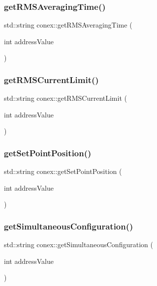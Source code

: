 \subsubsection{\texorpdfstring{get\+R\+M\+S\+Averaging\+Time()}{getRMSAveragingTime()}}
{\footnotesize\ttfamily std\+::string conex\+::get\+R\+M\+S\+Averaging\+Time (\begin{DoxyParamCaption}\item[{int}]{address\+Value }\end{DoxyParamCaption})}

\mbox{\label{namespaceconex_a7f0202ac44e29e633656eac06ca43cd0}} 
\subsubsection{\texorpdfstring{get\+R\+M\+S\+Current\+Limit()}{getRMSCurrentLimit()}}
{\footnotesize\ttfamily std\+::string conex\+::get\+R\+M\+S\+Current\+Limit (\begin{DoxyParamCaption}\item[{int}]{address\+Value }\end{DoxyParamCaption})}

\mbox{\label{namespaceconex_a785c9ad7e52441aef38faeccf75c1e5e}} 
\subsubsection{\texorpdfstring{get\+Set\+Point\+Position()}{getSetPointPosition()}}
{\footnotesize\ttfamily std\+::string conex\+::get\+Set\+Point\+Position (\begin{DoxyParamCaption}\item[{int}]{address\+Value }\end{DoxyParamCaption})}

\mbox{\label{namespaceconex_a66d5bce36b76f68906f18e8a553b07ea}} 
\subsubsection{\texorpdfstring{get\+Simultaneous\+Configuration()}{getSimultaneousConfiguration()}}
{\footnotesize\ttfamily std\+::string conex\+::get\+Simultaneous\+Configuration (\begin{DoxyParamCaption}\item[{int}]{address\+Value }\end{DoxyParamCaption})}

